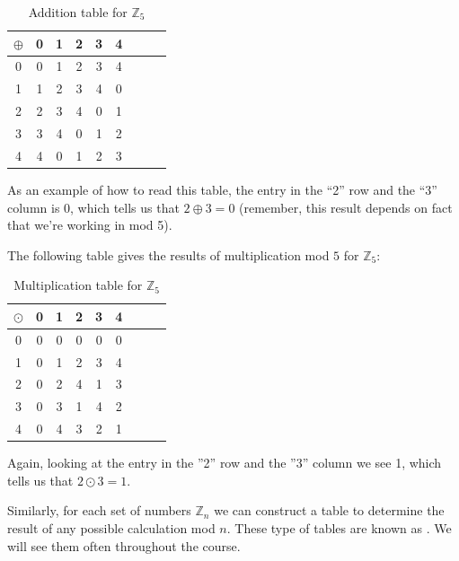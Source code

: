 \begin{table}[h]
\caption{\label{groups_Z5_add_table}Addition table for ${\mathbb Z}_5$}{\small
\begin{center}
\begin{tabular}{c|cccccccc}
$\oplus$ & 0 & 1 & 2 & 3 & 4 \\
\hline
0        & 0 & 1 & 2 & 3 & 4 \\
1       & 1 & 2 & 3 & 4 & 0 \\
2       & 2 & 3 & 4 & 0 & 1\\
3       & 3 & 4 & 0 & 1 & 2\\
4       & 4 & 0 & 1 & 2 & 3\\

\end{tabular}
\end{center}
}
\end{table}

\noindent
As an example of how to read this table, the entry in the ``2'' row and the ``3'' column is 0, which tells us that $2 \oplus 3 = 0$ 
(remember, this result depends on fact that we're working in mod 5).

The following table gives the results of multiplication mod $5$ for ${\mathbb Z}_{5}$:

\begin{table}[h]
\caption{\label{groups_Z5_mult_table} Multiplication table for ${\mathbb Z}_5$}
{ \small
\begin{center}
\begin{tabular}{c|cccccccc}
$\odot$ & 0 & 1 & 2 & 3 & 4 \\
\hline
0       & 0 & 0 & 0 & 0 & 0 \\
1       & 0 & 1 & 2 & 3 & 4  \\
2       & 0 & 2 & 4 & 1 & 3  \\
3       & 0 & 3 & 1 & 4 & 2  \\
4       & 0 & 4 & 3 & 2 & 1  \\

\end{tabular}
\end{center}
}
\end{table}

\noindent
Again, looking at the entry in the ''2'' row and the ''3'' column we see 1, which tells us that $2 \odot 3 = 1$.

Similarly, for each set of numbers ${\mathbb Z}_n$ we can construct a table to determine the result of any possible calculation mod $n$.
These type of tables are known as .  We will see them often throughout the course.

